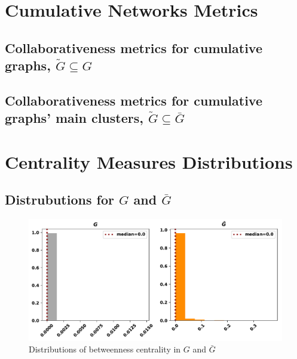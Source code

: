 \documentclass{article}
\theoremstyle{definition}
\begin{document}



\appendix

\section{Cumulative Networks Metrics}\label{appendix:tables}

\subsection{Collaborativeness metrics for cumulative graphs, \(\tilde{G} \subseteq G\)}
\begin{table}[!hbtp]
    \centering
    \resizebox{.8\textwidth}{!}{
    }
\end{table}

\newpage

\subsection{Collaborativeness metrics for cumulative graphs' main clusters, \(\tilde{G} \subseteq \bar{G}\)}
\begin{table}[!hbtp]
    \centering
    \resizebox{.8\textwidth}{!}{
    }
\end{table}


\section{Centrality Measures Distributions}

\subsection{Distrubutions for \(G\) and \(\bar{G}\)}

\begin{figure}[!hbtp]
    \centering
    \includegraphics[width=.8\textwidth]{./assets/images/pd_betweeness_centralities.pdf}
    \caption{Distributions of betweenness centrality in \(G\) and \(\bar{G}\)}
    \label{fig:bc_distributions}
\end{figure}
\end{document}
